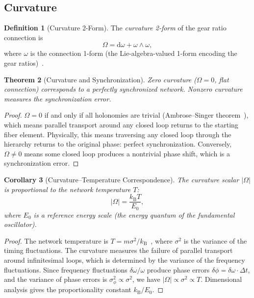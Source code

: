 \documentclass[11pt,twocolumn,a4paper]{article}
\newtheorem{theorem}{Theorem}[section]
\newtheorem{corollary}[theorem]{Corollary}
\theoremstyle{definition}
\newtheorem{definition}[theorem]{Definition}
\newcommand{\kB}{k_{\mathrm{B}}}
\newcommand{\dif}{\mathrm{d}}
\begin{document}
\subsection{Curvature}\label{sec:fb:curvature}

\begin{definition}[Curvature 2-Form]\label{def:curvature}
The \emph{curvature 2-form} of the gear ratio connection is
\begin{equation}\label{eq:curvature}
  \Omega = \dif\omega + \omega \wedge \omega,
\end{equation}
where $\omega$ is the connection 1-form (the Lie-algebra-valued 1-form encoding the
gear ratios)~\cite{kobayashi1963,nakahara2003}.
\end{definition}

\begin{theorem}[Curvature and Synchronization]\label{thm:curvature_sync}
Zero curvature ($\Omega = 0$, flat connection) corresponds to a perfectly synchronized
network. Nonzero curvature measures the synchronization error.
\end{theorem}

\begin{proof}
$\Omega = 0$ if and only if all holonomies are trivial (Ambrose--Singer
theorem~\cite{kobayashi1963}), which means parallel transport around any closed loop
returns to the starting fiber element. Physically, this means traversing any closed loop
through the hierarchy returns to the original phase: perfect synchronization. Conversely,
$\Omega \neq 0$ means some closed loop produces a nontrivial phase shift, which is a
synchronization error.
\end{proof}

\begin{corollary}[Curvature--Temperature Correspondence]\label{cor:curv_temp}
The curvature scalar $|\Omega|$ is proportional to the network temperature $T$:
\begin{equation}\label{eq:curv_temp}
  |\Omega| = \frac{\kB T}{E_0},
\end{equation}
where $E_0$ is a reference energy scale (the energy quantum of the fundamental oscillator).
\end{corollary}

\begin{proof}
The network temperature is $T = m\sigma^2/\kB$~\cite{sachikonye2025a}, where $\sigma^2$
is the variance of the timing fluctuations. The curvature measures the failure of parallel
transport around infinitesimal loops, which is determined by the variance of the frequency
fluctuations. Since frequency fluctuations $\delta\omega/\omega$ produce phase errors
$\delta\phi = \delta\omega \cdot \Delta t$, and the variance of phase errors is
$\sigma_\phi^2 \propto \sigma^2$, we have $|\Omega| \propto \sigma^2 \propto T$.
Dimensional analysis gives the proportionality constant $\kB/E_0$.
\end{proof}
\end{document}
